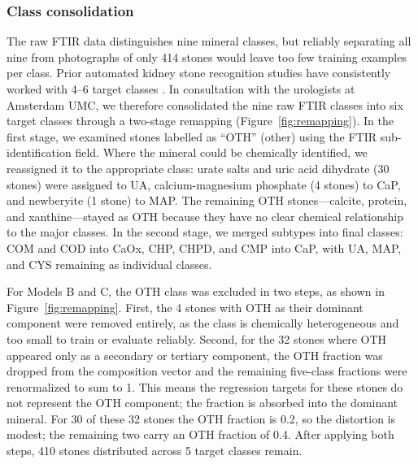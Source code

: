 \documentclass[10pt,twocolumn]{article}
\begin{document}
\subsubsection*{Class consolidation}

The raw FTIR data distinguishes nine mineral classes, but reliably separating all nine from photographs of only 414 stones would leave too few training examples per class. Prior automated kidney stone recognition studies have consistently worked with 4--6 target classes \cite{Black2020, Kim2022, LopezTiro2021, veltheer2025}. In consultation with the urologists at Amsterdam UMC, we therefore consolidated the nine raw FTIR classes into six target classes through a two-stage remapping (Figure~\ref{fig:remapping}). In the first stage, we examined stones labelled as ``OTH'' (other) using the FTIR sub-identification field. Where the mineral could be chemically identified, we reassigned it to the appropriate class: urate salts and uric acid dihydrate (30 stones) were assigned to UA, calcium-magnesium phosphate (4 stones) to CaP, and newberyite (1 stone) to MAP. The remaining OTH stones---calcite, protein, and xanthine---stayed as OTH because they have no clear chemical relationship to the major classes. In the second stage, we merged subtypes into final classes: COM and COD into CaOx, CHP, CHPD, and CMP into CaP, with UA, MAP, and CYS remaining as individual classes.

For Models B and C, the OTH class was excluded in two steps, as shown in Figure~\ref{fig:remapping}. First, the 4 stones with OTH as their dominant component were removed entirely, as the class is chemically heterogeneous and too small to train or evaluate reliably. Second, for the 32 stones where OTH appeared only as a secondary or tertiary component, the OTH fraction was dropped from the composition vector and the remaining five-class fractions were renormalized to sum to 1. This means the regression targets for these stones do not represent the OTH component; the fraction is absorbed into the dominant mineral. For 30 of these 32 stones the OTH fraction is 0.2, so the distortion is modest; the remaining two carry an OTH fraction of 0.4. After applying both steps, 410 stones distributed across 5 target classes remain.
\end{document}
